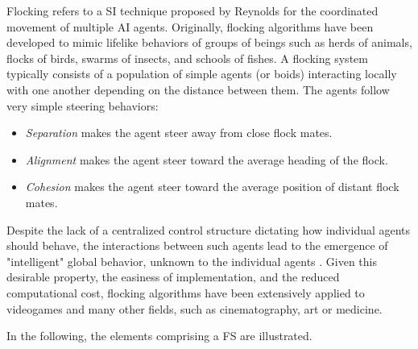 \documentclass[journal]{IEEEtran}
\begin{document}
Flocking refers to a SI technique proposed by Reynolds \cite{Reynolds87} for the coordinated movement of multiple AI agents. Originally, flocking algorithms have been developed to mimic lifelike behaviors of groups of beings such as herds of animals, flocks of birds, swarms of insects, and schools of fishes. A flocking system typically consists of a population of simple agents (or boids) interacting locally with one another depending on the distance between them. The agents follow very simple steering behaviors:

\begin{itemize}
	\item \textit{Separation} makes the agent steer away from close flock mates.
	\item \textit{Alignment} makes the agent steer toward the average heading of the flock.
	\item \textit{Cohesion} makes the agent steer toward the average position of distant flock mates.
\end{itemize} 

Despite the lack of a centralized control structure dictating how
individual agents should behave, the interactions between such agents
lead to the emergence of "intelligent" global behavior, unknown to the
individual agents \cite{SpectorEtAl03}. Given this desirable property,
the easiness of implementation, and the reduced computational cost,
flocking algorithms have been extensively applied to videogames
\cite{Scutt02} and many other fields, such as cinematography, art or medicine.

In the following, the elements comprising a FS are illustrated.
\end{document}
